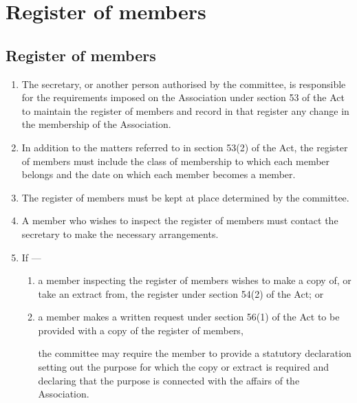 \documentclass[../constitution.tex]{subfiles}
\begin{document}
\hypertarget{division-3-register-of-members}{%
\section{Register of members}\label{division-3-register-of-members}}

\hypertarget{register-of-members}{%
\subsection{Register of members}\label{register-of-members}}

\begin{enumerate}

\item The secretary, or another person authorised by the committee, is responsible for the requirements imposed on the Association under section 53 of the Act to maintain the register of members and record in that register any change in the membership of the Association.
\item In addition to the matters referred to in section 53(2) of the Act, the register of members must include the class of membership to which each member belongs and the date on which each member becomes a member.
\item The register of members must be kept at place determined by the committee.
\item A member who wishes to inspect the register of members must contact the secretary to make the necessary arrangements.
\item If ---

  \begin{enumerate}
  \item a member inspecting the register of members wishes to make a copy of, or take an extract from, the register under section 54(2) of the Act; or
  \item a member makes a written request under section 56(1) of the Act to be provided with a copy of the register of members,

    the committee may require the member to provide a statutory declaration setting out the purpose for which the copy or extract is required and declaring that the purpose is connected with the affairs of the Association.
  \end{enumerate}
\end{enumerate}
\end{document}
